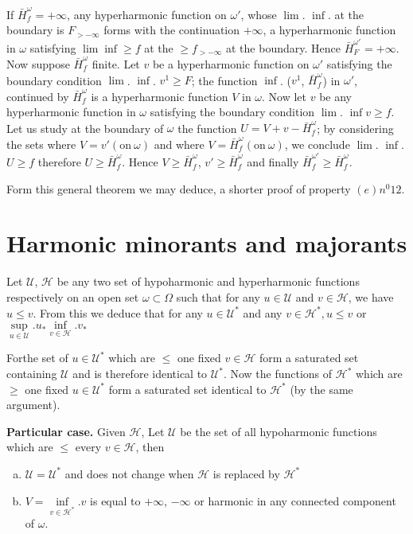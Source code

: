 If $\bar{H}^\omega_f = + \infty$, any hyperharmonic function on
$\omega'$, whose $\lim$. $\inf$. at the boundary is $F _{> - \infty}$
forms with the continuation $+ \infty$, a hyperharmonic function in
$\omega$ satisfying $\lim \inf \ge f $ at the $\ge f_{> - \infty}$ at
the boundary. Hence $\bar{H}^{\omega'}_F = + \infty$. Now suppose
$\bar{H}^\omega_f$ finite. Let $v$ be a hyperharmonic function on
$\omega'$ satisfying the boundary condition $\lim$. $\inf$. $v^1 \ge
F$; the function $\inf$. ($v^1$, $\bar{H}^{\omega}_f$) in $\omega'$,
continued by $\bar{H}^\omega_f$ is a hyperharmonic function $V$ in
$\omega$. Now let $v$ be any hyperharmonic function in $\omega$
satisfying the boundary condition $\lim$. $\inf v \ge f$. Let us study
at the boundary of $\omega$ the function $U = V + v -
\bar{H}^\omega_f$; by considering the sets where $V = v' (\text{on}~ \omega)$
and where $V = \bar{H}^\omega_f(\text{on}~ \omega)$, we conclude
$\lim$. $\inf$. $U \ge f$ therefore $U \ge \bar{H}^\omega_f$. Hence $V
\ge \bar{H}^\omega_f$, $v' \ge \bar{H}^\omega_f$ and finally
$\bar{H}^{\omega'}_f \ge \bar{H}^\omega_f$. 

\begin{remark*}
  Form this general theorem we may deduce, a shorter proof of property
  $(e) n^0 12$. 
\end{remark*}

\section{Harmonic minorants and majorants}\label{p4:chap4:sec16} %

Let $\mathscr{U}$, $\mathscr{H}$ be any two set of hypoharmonic and
hyperharmonic functions respectively on an open set $\omega \subset
\Omega$ such that for any $u \in \mathscr{U}$ and $v \in \mathscr{H}$,
we have $u \le v$. From this we deduce that for any $u \in
\mathscr{U}^*$ and any $v \in \mathscr{H}^*,  u \le v$ or
$\sup\limits_{u \in \mathscr{U}}.u_* \inf \limits_{v \in
  \mathscr{H}}.v_*$ 

For\pageoriginale the set of $u \in \mathscr{U}^*$ which are $\le $ one fixed $v \in
\mathscr{H}$ form a saturated set containing $\mathscr{U}$ and is
therefore identical to $\mathscr{U}^*$. Now the functions of
$\mathscr{H}^* $ which are $\ge$ one fixed $u \in \mathscr{U}^*$ form
a saturated set identical to $\mathscr{H}^*$ (by the same argument). 

\noindent
\textbf{Particular case.} Given $\mathscr{H}$, Let $\mathscr{U}$ be
the set of all hypoharmonic functions which are $\le$ every $v \in
\mathscr{H}$, then 
\begin{enumerate}[a)]
\item $\mathscr{U} = \mathscr{U}^*$ and does not change when
  $\mathscr{H}$ is replaced by $\mathscr{H}^*$ 
\item $V = \inf \limits_{v \in \mathscr{H}^*}.v$ is equal to $+
  \infty$, $- \infty$ or harmonic in any connected component of
  $\omega$. 
\end{enumerate}

